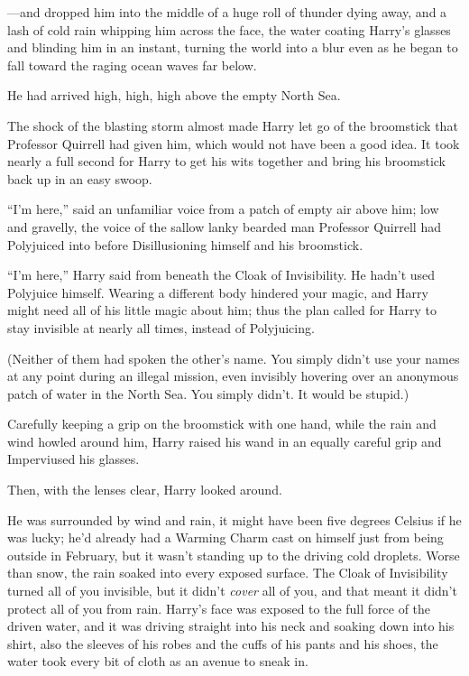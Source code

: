 ---and dropped him into the middle of a huge roll of thunder dying away,
and a lash of cold rain whipping him across the face, the water coating
Harry's glasses and blinding him in an instant, turning the world into a
blur even as he began to fall toward the raging ocean waves far below.

He had arrived high, high, high above the empty North Sea.

The shock of the blasting storm almost made Harry let go of the
broomstick that Professor Quirrell had given him, which would not have
been a good idea. It took nearly a full second for Harry to get his wits
together and bring his broomstick back up in an easy swoop.

``I'm here,'' said an unfamiliar voice from a patch of empty air above
him; low and gravelly, the voice of the sallow lanky bearded man
Professor Quirrell had Polyjuiced into before Disillusioning himself and
his broomstick.

``I'm here,'' Harry said from beneath the Cloak of Invisibility. He
hadn't used Polyjuice himself. Wearing a different body hindered your
magic, and Harry might need all of his little magic about him; thus the
plan called for Harry to stay invisible at nearly all times, instead of
Polyjuicing.

(Neither of them had spoken the other's name. You simply didn't use your
names at any point during an illegal mission, even invisibly hovering
over an anonymous patch of water in the North Sea. You simply didn't. It
would be stupid.)

Carefully keeping a grip on the broomstick with one hand, while the rain
and wind howled around him, Harry raised his wand in an equally careful
grip and Imperviused his glasses.

Then, with the lenses clear, Harry looked around.

He was surrounded by wind and rain, it might have been five degrees
Celsius if he was lucky; he'd already had a Warming Charm cast on
himself just from being outside in February, but it wasn't standing up
to the driving cold droplets. Worse than snow, the rain soaked into
every exposed surface. The Cloak of Invisibility turned all of you
invisible, but it didn't \emph{cover} all of you, and that meant it
didn't protect all of you from rain. Harry's face was exposed to the
full force of the driven water, and it was driving straight into his
neck and soaking down into his shirt, also the sleeves of his robes and
the cuffs of his pants and his shoes, the water took every bit of cloth
as an avenue to sneak in.

